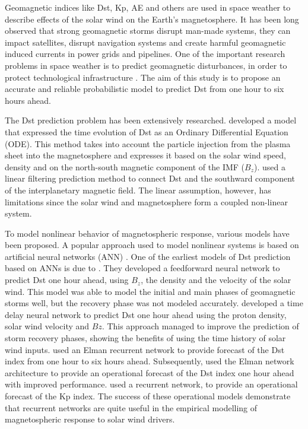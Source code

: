 Geomagnetic indices like Dst, Kp, AE and others are used in space weather to describe effects of the solar wind on 
the Earth's magnetosphere. It has been long observed that strong geomagnetic storms disrupt man-made systems, 
they can impact satellites, disrupt navigation systems and create harmful geomagnetic induced currents in power grids 
and pipelines. One of the important research problems in space weather is to predict geomagnetic disturbances, 
in order to protect technological infrastructure \citep{Singh2010}. The aim of this study is to propose an 
accurate and reliable probabilistic model to predict Dst from one hour to six hours ahead. 

The Dst prediction problem has been extensively researched. \citet{JGR:JGR10260} developed a model 
that expressed the time evolution of Dst as an Ordinary Differential Equation (ODE). This method takes into account 
the particle injection from the plasma sheet into the magnetosphere and expresses it based on the solar wind speed, 
density and on the north-south magnetic component of the IMF ($B_z$). \citet{Iyemori1979} used a linear filtering 
prediction method to connect Dst and the southward component of the interplanetary magnetic field. The linear 
assumption, however, has limitations since  the solar wind and magnetosphere form a coupled non-linear system. 

To model nonlinear behavior of magnetospheric response, various models have been proposed. A popular approach 
used to model nonlinear systems is based on artificial neural networks (ANN) \citep{haykin1994neural}. One of the 
earliest models of Dst prediction based on ANNs is due to \citet{lundstedt1994prediction}. They developed 
a feedforward neural network to predict Dst one hour ahead, using $B_z$, the density and the velocity of 
the solar wind. This model was able to model the initial and main phases of geomagnetic storms well, but 
the recovery phase was not modeled accurately. \citet{gleisner1996predicting} developed a time delay 
neural network \citep{Waibel1989} to predict Dst one hour ahead using the proton density, solar wind 
velocity and $Bz$. This approach managed to improve the prediction of storm recovery phases, showing 
the benefits of using the time history of solar wind inputs. \citet{wu1997geomagnetic} used an Elman 
recurrent network \citep{elman} to provide forecast of the Dst index from one hour to six hours ahead. 
Subsequently, \citet{Lund} used the Elman network architecture to provide an operational forecast of 
the Dst index one hour ahead with improved performance. \citet{JGRA:JGRA17461} used a recurrent network, 
to provide an operational forecast of the Kp index. The success of these operational models demonstrate that 
recurrent networks are quite useful in the empirical modelling of magnetospheric response to solar wind drivers. 

